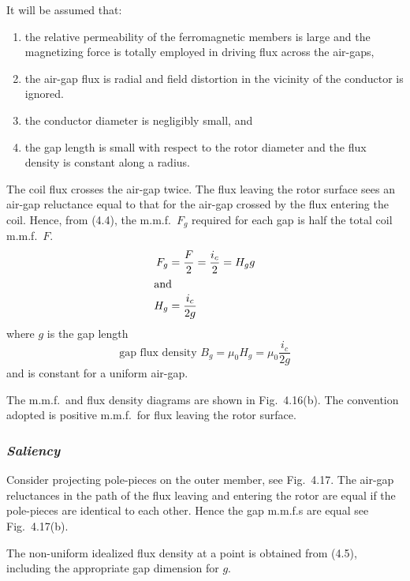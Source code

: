 \documentclass[a4paper,numbers=noenddot,12pt]{scrbook}
\begin{document}
            It will be assumed that:
            \begin{enumerate}
                \item the relative permeability of the ferromagnetic members is large and the magnetizing force is totally employed in driving flux across the air-gaps,
                \item the air-gap flux is radial and field distortion in the vicinity of the conductor is ignored.
                \item the conductor diameter is negligibly small, and
                \item the gap length is small with respect to the rotor diameter and the flux density is constant along a radius.
            \end{enumerate}
            The coil flux crosses the air-gap twice. The flux leaving the rotor surface sees an air-gap reluctance equal to that for the air-gap crossed by the flux entering the coil. Hence, from (4.4), the m.m.f.\ $F_g$ required for each gap is half the total coil m.m.f.\ $F$.
            \begin{align*}
                F_g & = \dfrac{F}{2} = \dfrac{i_c}{2} = H_g g \\
                \intertext{and}
                H_g & = \dfrac{i_c}{2g}
            \end{align*}
            where $g$ is the gap length
            \begin{equation}
                \text{gap flux density } B_g = \mu_0 H_g = \mu_0 \dfrac{i_c}{2g}
                \label{eq:Eq4.5}
            \end{equation}
            and is constant for a uniform air-gap. 

            The m.m.f.\ and flux density diagrams are shown in Fig.\ 4.16(b). The convention adopted is positive m.m.f.\ for flux leaving the rotor surface. 

            \subsubsection{\textit{Saliency}}
            Consider projecting pole-pieces on the outer member, see Fig.\ 4.17. The air-gap reluctances in the path of the flux leaving and entering the rotor are equal if the pole-pieces are identical to each other. Hence the gap m.m.f.s are equal see Fig.\ 4.17(b).

            The non-uniform idealized flux density at a point is obtained from (4.5), including the appropriate gap dimension for $g$. 
\end{document}
